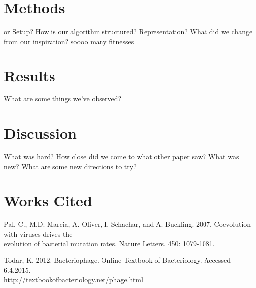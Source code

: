 \documentclass[11pt, oneside]{article}
\begin{document}
\section{Methods}
or Setup? How is our algorithm structured? Representation? What did we change from our inspiration?
soooo many fitnesses

\section{Results}
What are some things we've observed?

\section{Discussion}
What was hard? How close did we come to what other paper saw? What was new? What are some new directions to try? 

\section{Works Cited}
Pal, C., M.D. Marcia, A. Oliver, I. Schachar, and A. Buckling. 2007. Coevolution with viruses drives the \\\-\hspace{0.75cm} evolution of bacterial mutation rates. Nature Letters. 450: 1079-1081.

Todar, K. 2012. Bacteriophage. Online Textbook of Bacteriology. Accessed 6.4.2015.\\ \-\hspace{0.75cm} http://textbookofbacteriology.net/phage.html
\end{document}
